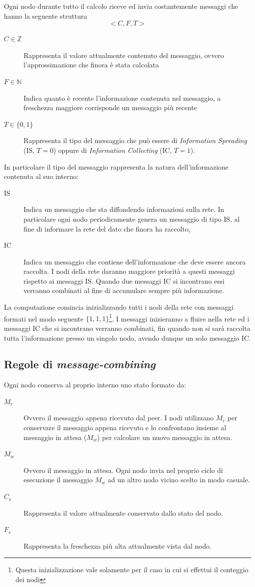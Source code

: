 \documentclass[a4paper,12pt]{article}
\begin{document}
Ogni nodo durante tutto il calcolo riceve ed invia costantemente messaggi che hanno la seguente struttura
$$ < C, F, T > $$
\begin{description}
\item[$C \in \mathbb{Z}$] Rappresenta il valore attualmente contenuto del messaggio, ovvero l'approssimazione che finora \`e stata calcolata
\item[$F \in \mathbb{N}$] Indica quanto \`e recente l'informazione contenuta nel messaggio, a freschezza maggiore corrisponde un messaggio pi\`u recente
\item[$T \in \{0,1\}$] Rappresenta il tipo del messaggio che pu\`o essere di \emph{Information Spreading} (IS, $T = 0$) oppure di \emph{Information Collecting} (IC, $T = 1$).
\end{description}
In particolare il tipo del messaggio rappresenta la natura dell'informazione contenuta al suo interno:
\begin{description}
\item[IS] Indica un messaggio che sta diffondendo informazioni sulla rete. In particolare ogni nodo periodicamente genera un messaggio di tipo IS, al fine di informare la rete del dato che finora ha raccolto,
\item[IC] Indica un messaggio che contiene dell'informazione che deve essere ancora raccolta. I nodi della rete daranno maggiore priorit\`a a questi messaggi rispetto ai messaggi IS. Quando due messaggi IC si incontrano essi verranno combinati al fine di accumulare sempre pi\`u informazione.
\end{description}
La computazione comincia inizializzando tutti i nodi della rete con messaggi formati nel modo seguente $\{ 1, 1, 1 \}$\footnote{Questa inizializzazione vale solamente per il caso in cui si effettui il conteggio dei nodi}. I messaggi inizieranno a fluire nella rete ed i messaggi IC che si incontrano verranno combinati, fin quando non si sar\`a raccolta tutta l'informazione presso un singolo nodo, avendo dunque un solo messaggio IC.


\subsection{Regole di \emph{message-combining}}
\label{sec:combining}

Ogni nodo conserva al proprio interno uno stato formato da:
\begin{description}
\item[$M_r$] Ovvero il messaggio appena ricevuto dal peer. I nodi utilizzano $M_r$ per conservare il messaggio appena ricevuto e lo confrontano insieme al messaggio in attesa ($M_w$) per calcolare un nuovo messaggio in attesa.
\item[$M_w$] Ovvero il messaggio in attesa. Ogni nodo invia nel proprio ciclo di esecuzione il messaggio $M_w$ ad un altro nodo vicino scelto in modo casuale.
\item[$C_s$] Rappresenta il valore attualmente conservato dallo stato del nodo.
\item[$F_s$] Rappresenta la freschezza pi\`u alta attualmente vista dal nodo.
\end{description}
\end{document}
